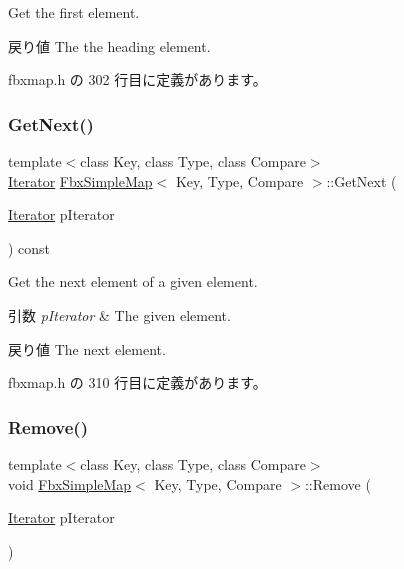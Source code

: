 Get the first element. \begin{DoxyReturn}{戻り値}
The the heading element. 
\end{DoxyReturn}


 fbxmap.\+h の 302 行目に定義があります。

\mbox{\label{class_fbx_simple_map_a37468d01716cbf6528a0cc26e82f7e90}} 
\subsubsection{\texorpdfstring{Get\+Next()}{GetNext()}}
{\footnotesize\ttfamily template$<$class Key, class Type, class Compare$>$ \\
\hyperlink{class_fbx_simple_map_aaa589eb5e1ccdd11dffd018f3212e13e}{Iterator} \hyperlink{class_fbx_simple_map}{Fbx\+Simple\+Map}$<$ Key, Type, Compare $>$\+::Get\+Next (\begin{DoxyParamCaption}\item[{\hyperlink{class_fbx_simple_map_aaa589eb5e1ccdd11dffd018f3212e13e}{Iterator}}]{p\+Iterator }\end{DoxyParamCaption}) const\hspace{0.3cm}{\ttfamily [inline]}}

Get the next element of a given element. 
\begin{DoxyParams}{引数}
{\em p\+Iterator} & The given element. \\
\hline
\end{DoxyParams}
\begin{DoxyReturn}{戻り値}
The next element. 
\end{DoxyReturn}


 fbxmap.\+h の 310 行目に定義があります。

\mbox{\label{class_fbx_simple_map_ab97e03572ab94e42903a9c29c7e904ef}} 
\subsubsection{\texorpdfstring{Remove()}{Remove()}}
{\footnotesize\ttfamily template$<$class Key, class Type, class Compare$>$ \\
void \hyperlink{class_fbx_simple_map}{Fbx\+Simple\+Map}$<$ Key, Type, Compare $>$\+::Remove (\begin{DoxyParamCaption}\item[{\hyperlink{class_fbx_simple_map_aaa589eb5e1ccdd11dffd018f3212e13e}{Iterator}}]{p\+Iterator }\end{DoxyParamCaption})\hspace{0.3cm}{\ttfamily [inline]}}

